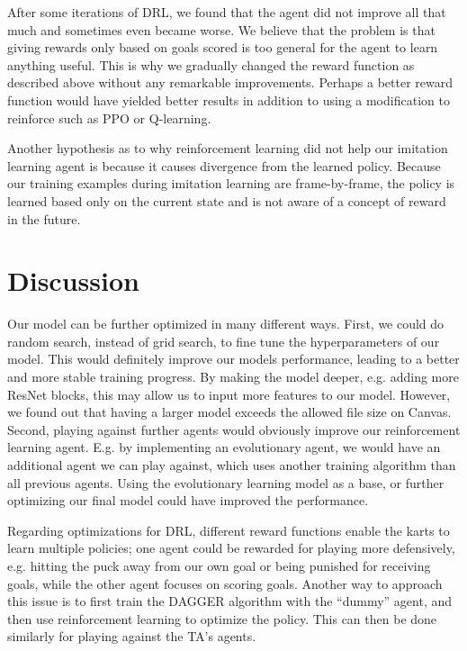 \documentclass[10pt,twocolumn,letterpaper]{article}
\begin{document}
After some iterations of DRL, we found that the agent did not improve all that much and sometimes even became worse. We believe that the problem is that giving rewards only based on goals scored is too general for the agent to learn anything useful. This is why we gradually changed the reward function as described above without any remarkable improvements. Perhaps a better reward function would have yielded better results in addition to using a modification to reinforce such as PPO or Q-learning.

Another hypothesis as to why reinforcement learning did not help our imitation learning agent is because it causes divergence from the learned policy. Because our training examples during imitation learning are frame-by-frame, the policy is learned based only on the current state and is not aware of a concept of reward in the future. 

\section{Discussion}

Our model can be further optimized in many different ways. First, we could do random search, instead of grid search, to fine tune the hyperparameters of our model. This would definitely improve our models performance, leading to a better and more stable training progress. By making the model deeper, e.g. adding more ResNet blocks, this may allow us to input more features to our model. However, we found out that having a larger model exceeds the allowed file size on Canvas. Second, playing against further agents would obviously improve our reinforcement learning agent. E.g. by implementing an evolutionary agent, we would have an additional agent we can play against, which uses another training algorithm than all previous agents. Using the evolutionary learning model as a base, or further optimizing our final model could have improved the performance.

Regarding optimizations for DRL, different reward functions enable the karts to learn multiple policies; one agent could be rewarded for playing more defensively, e.g. hitting the puck away from our own goal or being punished for receiving goals, while the other agent focuses on scoring goals. Another way to approach this issue is to first train the DAGGER algorithm with the “dummy” agent, and then use reinforcement learning to optimize the policy. This can then be done similarly for playing against the TA’s agents.
\end{document}
